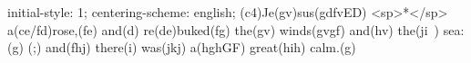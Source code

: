 initial-style: 1;
centering-scheme: english;
(c4)Je(gv)sus(gdfvED) <sp>*</sp> a(ce/fd)rose,(fe) and(d) re(de)buked(fg) the(gv) winds(gvgf) and(hv) the(ji~) sea:(g) (;) and(fhj) there(i) was(jkj) a(hghGF) great(hih) calm.(g)
